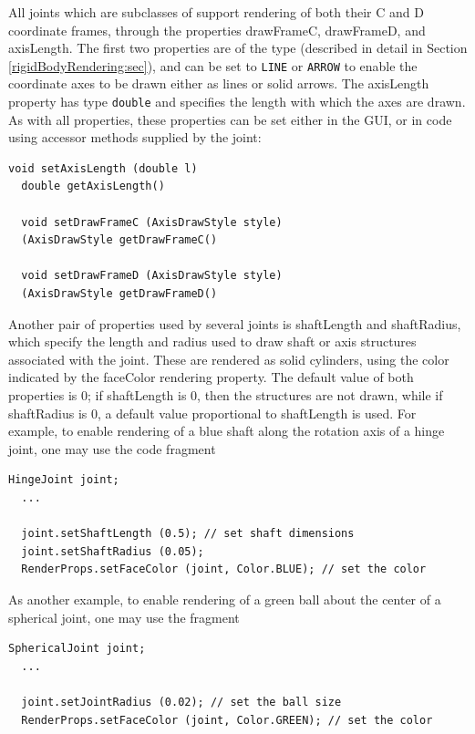 All joints which are subclasses of
 support rendering of
both their C and D coordinate frames, through the properties {\sf
drawFrameC}, {\sf drawFrameD}, and {\sf axisLength}.  The first two
properties are of the type
 (described
in detail in Section \ref{rigidBodyRendering:sec}), and can be set to
{\tt LINE} or {\tt ARROW} to enable the coordinate axes to be drawn
either as lines or solid arrows. The {\sf axisLength} property has
type {\tt double} and specifies the length with which the axes are
drawn. As with all properties, these properties can be set either in
the GUI, or in code using accessor methods supplied by the joint:
\begin{lstlisting}[]
  void setAxisLength (double l)
  double getAxisLength()

  void setDrawFrameC (AxisDrawStyle style)
  (AxisDrawStyle getDrawFrameC()

  void setDrawFrameD (AxisDrawStyle style)
  (AxisDrawStyle getDrawFrameD()
\end{lstlisting}
%

Another pair of properties used by several joints is {\sf shaftLength}
and {\sf shaftRadius}, which specify the length and radius used to
draw shaft or axis structures associated with the joint.  These are
rendered as solid cylinders, using the color indicated by the {\sf
faceColor} rendering property.  The default value of both properties
is 0; if {\sf shaftLength} is 0, then the structures are not drawn,
while if {\sf shaftRadius} is 0, a default value proportional to {\sf
shaftLength} is used. For example, to enable rendering of a blue shaft
along the rotation axis of a hinge joint, one may use the code
fragment
%
\begin{lstlisting}[]
  HingeJoint joint;
  ...

  joint.setShaftLength (0.5); // set shaft dimensions
  joint.setShaftRadius (0.05);
  RenderProps.setFaceColor (joint, Color.BLUE); // set the color
\end{lstlisting}
%
As another example, to enable rendering of a green ball about the
center of a spherical joint, one may use the fragment
%
\begin{lstlisting}[]
  SphericalJoint joint;
  ...

  joint.setJointRadius (0.02); // set the ball size
  RenderProps.setFaceColor (joint, Color.GREEN); // set the color
\end{lstlisting}
%

